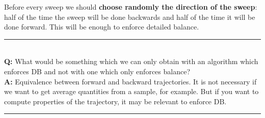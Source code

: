 Before every sweep we should \textbf{choose randomly the direction of the sweep}: half of the time the sweep will be done backwards and half of the time it will be done forward. This will be enough to enforce detailed balance.\\
\noindent\rule{8cm}{0.4pt}\\
\textbf{Q: }What would be something which we can only obtain with an algorithm which enforces DB and not with one which only enforces balance?\\
\textbf{A: }Equivalence between forward and backward trajectories. It is not necessary if we want to get average quantities from a sample, for example. But if you want to compute properties of the trajectory, it may be relevant to enforce DB.\\
\noindent\rule{8cm}{0.4pt}\\
